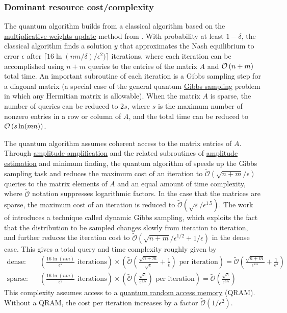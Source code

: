 \begin{refsection}
\subsubsection*{Dominant resource cost/complexity}
The quantum algorithm builds from a classical algorithm based on the \hyperref[prim:MWU]{multiplicative weights update} method from \cite{grigoriadis1995SubLinRndApxAlgMatrixGames}. With probability at least $1-\delta$, the classical algorithm finds a solution $y$ that approximates the Nash equilibrium to error $\epsilon$ after $\lceil 16 \ln(nm/\delta)/\epsilon^2)\rceil $ iterations, where each iteration can be accomplished using $n+m$ queries to the entries of the matrix $A$ and $\mathcal{O}\left( n+m \right)$ total time. An important subroutine of each iteration is a Gibbs sampling step for a diagonal matrix (a special case of the general quantum \hyperref[prim:GibbsSampling]{Gibbs sampling} problem in which any Hermitian matrix is allowable). When the matrix $A$ is sparse, the number of queries can be reduced to $2s$, where $s$ is the maximum number of nonzero entries in a row or column of $A$, and the total time can be reduced to $\mathcal{O}\left( s\ln(mn) \right)$.

The quantum algorithm assumes coherent access to the matrix entries of $A$. Through \hyperref[prim:AmpAmp]{amplitude amplification} and the related subroutines of \hyperref[prim:AmpEst]{amplitude estimation} and minimum finding, the quantum algorithm of \cite{apeldoorn2019QAlgorithmsForZeroSumGames} speeds up the Gibbs sampling task and reduces the maximum cost of an iteration to $\tilde{\mathcal{O}}(\sqrt{n+m}/\epsilon)$ queries to the matrix elements of $A$ and an equal amount of time complexity, where $\tilde{\mathcal{O}}$ notation suppresses logarithmic factors. In the case that the matrices are sparse, the maximum cost of an iteration is reduced to $\tilde{\mathcal{O}}(\sqrt{s}/\epsilon^{1.5})$. The work of \cite{bouland2023zerosum} introduces a technique called dynamic Gibbs sampling, which exploits the fact that the distribution to be sampled changes slowly from iteration to iteration, and further reduces the iteration cost to $\tilde{\mathcal{O}}(\sqrt{n+m}/\epsilon^{1/2} +1/\epsilon)$ in the dense case. This gives a total query and time complexity roughly given by
%
\begin{align}
\text{dense:} \;\;\; & \left(\frac{16\ln(nm)}{\epsilon^2} \text{ iterations}\right)\times \left(\tilde{\mathcal{O}}\left(\frac{\sqrt{n+m}}{\sqrt{\epsilon}} + \frac{1}{\epsilon}\right) \text{ per iteration}\right) = \tilde{\mathcal{O}}\left(\frac{\sqrt{n+m}}{\epsilon^{2.5}} + \frac{1}{\epsilon^3}\right)\\
\text{sparse:} \;\;\; & \left(\frac{16\ln(nm)}{\epsilon^2} \text{ iterations}\right)\times \left(\tilde{\mathcal{O}}\left(\frac{\sqrt{s}}{\epsilon^{1.5}}\right) \text{ per iteration}\right) = \tilde{\mathcal{O}}\left(\frac{\sqrt{s}}{\epsilon^{3.5}}\right)& 
\end{align}
%
This complexity assumes access to a \hyperref[prim:QRAM]{quantum random access memory} (QRAM). Without a QRAM, the cost per iteration increases by a factor $\tilde{\mathcal{O}}(1/\epsilon^2)$. 


\end{refsection}
